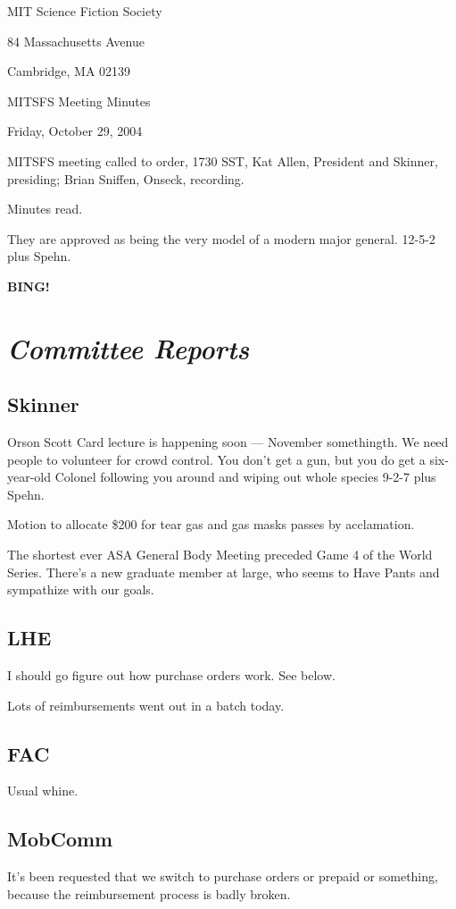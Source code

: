 \documentclass[10pt]{article}
\newcommand{\bing}{{\bf BING!} }
\newcommand{\goto}[1]{\bing \vskip 12pt \section*{{\em{#1}}}}
\newcommand{\ps}{ plus Spehn\xspace}
\begin{document}
\begin{center}

MIT Science Fiction Society

84 Massachusetts Avenue

Cambridge, MA 02139

\vspace{12pt}

MITSFS Meeting Minutes

Friday, October 29, 2004

\end{center}

\vspace{18pt}

\setlength{\parskip}{6pt}

\noindent
MITSFS meeting called to order, 1730 SST, Kat Allen, President and
Skinner, presiding; Brian Sniffen,  Onseck, recording.

Minutes read.

They are approved as being the very model of a modern major general.
12-5-2\ps.

\goto{Committee Reports}
\subsection*{Skinner}
Orson Scott Card lecture is happening soon --- November somethingth.
We need people to volunteer for crowd control.  You don't get a gun,
but you do get a six-year-old Colonel following you around and wiping
out whole species 9-2-7\ps.

Motion to allocate \$200 for tear gas and gas masks passes by
acclamation.

The shortest ever ASA General Body Meeting preceded Game 4 of the
World Series.  There's a new graduate member at large, who seems to
Have Pants and sympathize with our goals.

\subsection*{LHE}
I should go figure out how purchase orders work.  See below.

Lots of reimbursements went out in a batch today.

\subsection*{FAC}
Usual whine.

\subsection*{MobComm}
It's been requested that we switch to purchase orders or prepaid or
something, because the reimbursement process is badly broken.
\end{document}
